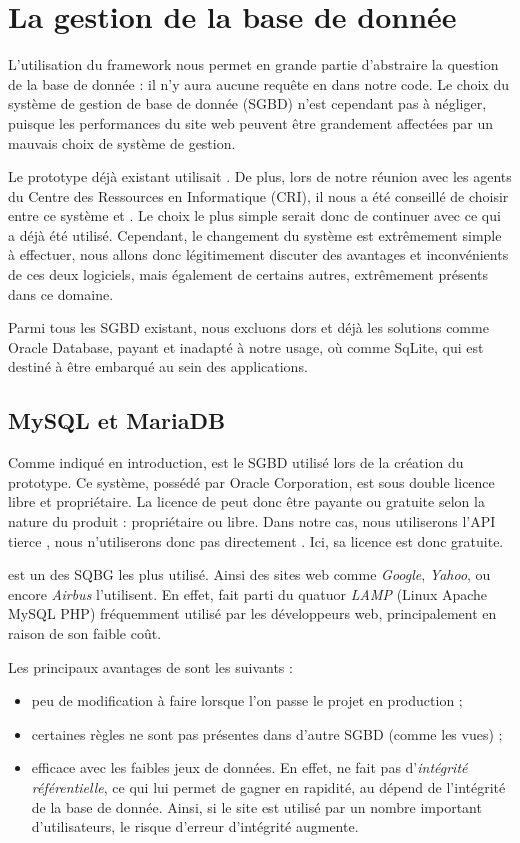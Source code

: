 \section{La gestion de la base de donnée}

L'utilisation du framework \symfony nous permet en grande partie d'abstraire la question de la base de donnée : il n'y aura aucune requête en \sql dans notre code. 
Le choix du système de gestion de base de donnée (SGBD) n'est cependant pas  à négliger, puisque les performances du site web peuvent être grandement affectées par un mauvais choix de système de gestion. 

Le prototype déjà existant utilisait \mysql. 
De plus, lors de notre réunion avec les agents du Centre des Ressources en Informatique (CRI), il nous a été conseillé de choisir entre ce système et \psql. 
Le choix le plus simple serait donc de continuer avec ce qui a déjà été utilisé. 
Cependant, le changement du système est extrêmement simple à effectuer, nous allons donc légitimement  discuter des avantages et inconvénients de ces deux logiciels, mais également de certains autres, extrêmement présents dans ce domaine. 

Parmi tous les SGBD existant, nous excluons dors et déjà les solutions comme Oracle Database, payant et inadapté à notre usage, où comme SqLite, qui est destiné à être embarqué au sein des applications. 


\subsection{MySQL et MariaDB}
 
 Comme indiqué en introduction, \mysql est le SGBD utilisé lors de la création du prototype. Ce système, possédé par Oracle Corporation, est sous double licence libre et propriétaire. La licence de \mysql peut donc être payante ou gratuite selon la nature du produit : propriétaire ou libre. Dans notre cas, nous utiliserons l'API tierce \symfony, nous n'utiliserons donc pas directement \mysql. Ici, sa licence est donc gratuite. 
 
 \mysql est un des SQBG les plus utilisé. Ainsi des sites web comme \textit{Google}, \textit{Yahoo}, ou encore \textit{Airbus}	l'utilisent. En effet, \mysql fait parti du quatuor \textit{LAMP} (Linux Apache MySQL PHP) fréquemment utilisé par les développeurs web, principalement en raison de son faible coût. 
 
 \smallbreak
 
 Les principaux avantages de \mysql sont les suivants : 
 \begin{itemize}
 \item peu de modification à faire lorsque l'on passe le projet en production  ;
 \item certaines règles ne sont pas présentes dans d'autre SGBD (comme les vues) ;
 \item efficace avec les faibles jeux de données. En effet, \mysql ne fait pas d'\textit{intégrité référentielle}, ce qui lui permet de gagner en rapidité, au dépend de l'intégrité de la base de donnée. Ainsi, si le site est utilisé par un nombre important d'utilisateurs, le risque d'erreur d'intégrité augmente. 
 \end{itemize}

